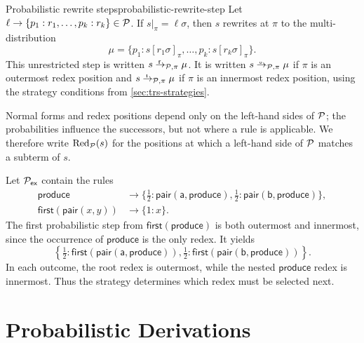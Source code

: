 \begin{Definition}{Probabilistic rewrite steps}{probabilistic-rewrite-step}
  Let $\ell\to\{p_1:r_1,\ldots,p_k:r_k\}\in\P$.  If
  $s|_\pi=\ell\sigma$, then $s$ rewrites at $\pi$ to the multi-distribution
  \[
    \mu=\{p_1:s[r_1\sigma]_\pi,\ldots,
             p_k:s[r_k\sigma]_\pi\}.
  \]
  This unrestricted step is written $s\fto_{\P,\pi}\mu$.  It is written
  $s\oto_{\P,\pi}\mu$ if $\pi$ is an outermost redex position and
  $s\ito_{\P,\pi}\mu$ if $\pi$ is an innermost redex position, using the
  strategy conditions from \cref{sec:trs-strategies}.
\end{Definition}

Normal forms and redex positions depend only on the left-hand sides of $\P$;
the probabilities influence the successors, but not where a rule is
applicable.  We therefore write $\operatorname{Red}_{\P}(s)$ for the positions
at which a left-hand side of $\P$ matches a subterm of $s$.

\begin{example}\label{ex:probabilistic-strategy-difference}
  Let $\P_{\mathsf{ex}}$ contain the rules
  \[
    \begin{aligned}
      \mathsf{produce}
        &\to
        \{\tfrac12:\mathsf{pair}(\mathsf a,\mathsf{produce}),
          \tfrac12:\mathsf{pair}(\mathsf b,\mathsf{produce})\},\\
      \mathsf{first}(\mathsf{pair}(x,y))
        &\to\{1:x\}.
    \end{aligned}
  \]
  The first probabilistic step from $\mathsf{first}(\mathsf{produce})$ is both
  outermost and innermost, since the occurrence of $\mathsf{produce}$ is the
  only redex.  It yields
  \[
    \left\{
      \tfrac12:\mathsf{first}(\mathsf{pair}(\mathsf a,\mathsf{produce})),
      \tfrac12:\mathsf{first}(\mathsf{pair}(\mathsf b,\mathsf{produce}))
    \right\}.
  \]
  In each outcome, the root redex is outermost, while the nested
  $\mathsf{produce}$ redex is innermost.  Thus the strategy determines which
  redex must be selected next.
\end{example}

\section{Probabilistic Derivations}\label{sec:probabilistic-derivations}

